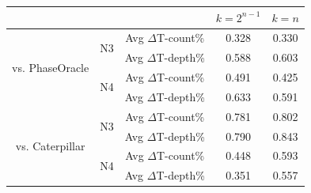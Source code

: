 \begin{tabular}{c|c|c|c|c}\hline
                                   &                       &                       & $k=2^{n-1}$ & $k=n$    \\\hline
  \multirow{4}{*}{vs. PhaseOracle} &  \multirow{2}{*}{N3}  & Avg $\Delta$T-count\% &  0.328      & 0.330    \\\cline{3-5}
                                   &                       & Avg $\Delta$T-depth\% &  0.588      & 0.603    \\\cline{2-5}
                                   &  \multirow{2}{*}{N4}  & Avg $\Delta$T-count\% &  0.491      & 0.425    \\\cline{3-5}
                                   &                       & Avg $\Delta$T-depth\% &  0.633      & 0.591    \\\hline
  \multirow{4}{*}{vs. Caterpillar} &  \multirow{2}{*}{N3}  & Avg $\Delta$T-count\% &  0.781      & 0.802    \\\cline{3-5}
                                   &                       & Avg $\Delta$T-depth\% &  0.790      & 0.843    \\\cline{2-5}
                                   &  \multirow{2}{*}{N4}  & Avg $\Delta$T-count\% &  0.448      & 0.593    \\\cline{3-5}
                                   &                       & Avg $\Delta$T-depth\% &  0.351      & 0.557    \\\hline
\end{tabular}

